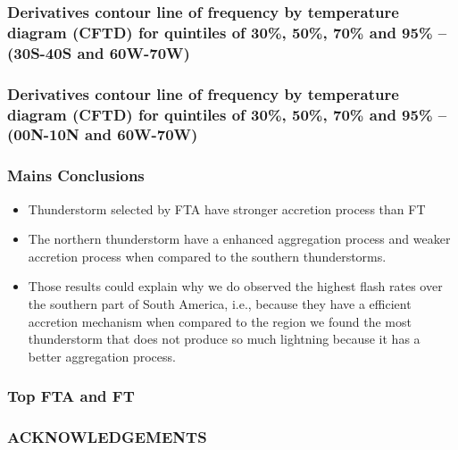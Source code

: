 \documentclass[smaller]{beamer}
\begin{document}
\begin{frame}
\frametitle{Derivatives contour line of frequency by temperature diagram (CFTD)  for quintiles of 30\%, 50\%, 70\% and 95\% -- (30S-40S and 60W-70W)}

\end{frame}

\begin{frame}
\frametitle{Derivatives contour line of frequency by temperature diagram (CFTD)  for quintiles of 30\%, 50\%, 70\% and 95\% -- (00N-10N and 60W-70W)}

\end{frame}




\begin{frame}
\frametitle{Mains Conclusions}
\begin{itemize}
\item Thunderstorm selected by FTA have stronger accretion process than FT
\item The northern thunderstorm have a enhanced aggregation process and weaker accretion process when compared to the southern thunderstorms.
\item Those results could explain why we do observed the highest flash rates over the southern part of South America, i.e., because they have a efficient accretion mechanism when compared to the region we found the most thunderstorm that does not produce so much lightning because it has a better aggregation process.
\end{itemize}

\end{frame}

\begin{frame}
\frametitle{Top FTA and FT}

\end{frame}


\begin{frame}
\frametitle{ACKNOWLEDGEMENTS}



\end{frame}
\end{document}
